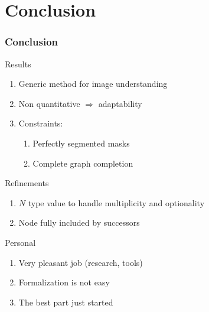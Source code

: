 
\section{Conclusion}
	\begin{frame}
		\frametitle{Conclusion}
		\begin{block}{Results}
			\begin{enumerate}
				\item	Generic method for image understanding
				\item	Non quantitative $\Rightarrow$ adaptability
				\item	Constraints:
				\begin{enumerate}
					\item	Perfectly segmented masks
					\item	Complete graph completion			
				\end{enumerate}
			\end{enumerate}
		\end{block}
		\begin{block}{Refinements}
			\begin{enumerate}
				\item	$N$ type value to handle multiplicity and optionality
				\item	Node fully included by successors
			\end{enumerate}
		\end{block}
		
		\begin{block}{Personal}
			\begin{enumerate}
				\item Very pleasant job (research, tools)
				\item Formalization is not easy
				\item The best part just started
			\end{enumerate}
		\end{block}
	\end{frame}



